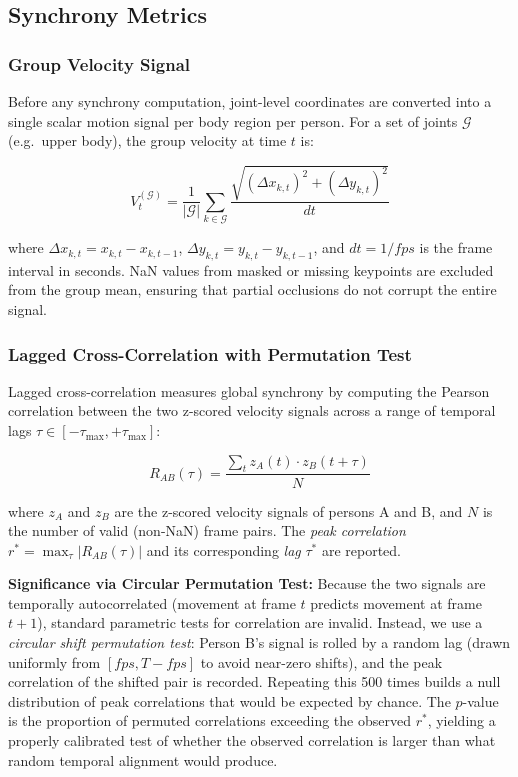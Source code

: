 \documentclass[11pt]{article}
\begin{document}
\subsection{Synchrony Metrics}

\subsubsection{Group Velocity Signal}
Before any synchrony computation, joint-level coordinates are converted into a single scalar motion signal per body region per person. For a set of joints $\mathcal{G}$ (e.g.\ upper body), the group velocity at time $t$ is:

\begin{equation}
    V_t^{(\mathcal{G})} = \frac{1}{|\mathcal{G}|} \sum_{k \in \mathcal{G}}
        \frac{\sqrt{(\Delta x_{k,t})^2 + (\Delta y_{k,t})^2}}{dt}
\end{equation}

where $\Delta x_{k,t} = x_{k,t} - x_{k,t-1}$, $\Delta y_{k,t} = y_{k,t} - y_{k,t-1}$, and $dt = 1/fps$ is the frame interval in seconds. NaN values from masked or missing keypoints are excluded from the group mean, ensuring that partial occlusions do not corrupt the entire signal.

\subsubsection{Lagged Cross-Correlation with Permutation Test}
Lagged cross-correlation measures global synchrony by computing the Pearson correlation between the two z-scored velocity signals across a range of temporal lags $\tau \in [-\tau_{\max}, +\tau_{\max}]$:

\begin{equation}
    R_{AB}(\tau) = \frac{\sum_{t} z_A(t) \cdot z_B(t + \tau)}{N}
\end{equation}

where $z_A$ and $z_B$ are the z-scored velocity signals of persons A and B, and $N$ is the number of valid (non-NaN) frame pairs. The \textit{peak correlation} $r^* = \max_\tau |R_{AB}(\tau)|$ and its corresponding \textit{lag} $\tau^*$ are reported.

\vspace{0.5em}
\noindent\textbf{Significance via Circular Permutation Test:}
Because the two signals are temporally autocorrelated (movement at frame $t$ predicts movement at frame $t+1$), standard parametric tests for correlation are invalid. Instead, we use a \textit{circular shift permutation test}: Person B's signal is rolled by a random lag (drawn uniformly from $[fps, T - fps]$ to avoid near-zero shifts), and the peak correlation of the shifted pair is recorded. Repeating this 500 times builds a null distribution of peak correlations that would be expected by chance. The $p$-value is the proportion of permuted correlations exceeding the observed $r^*$, yielding a properly calibrated test of whether the observed correlation is larger than what random temporal alignment would produce.
\end{document}
